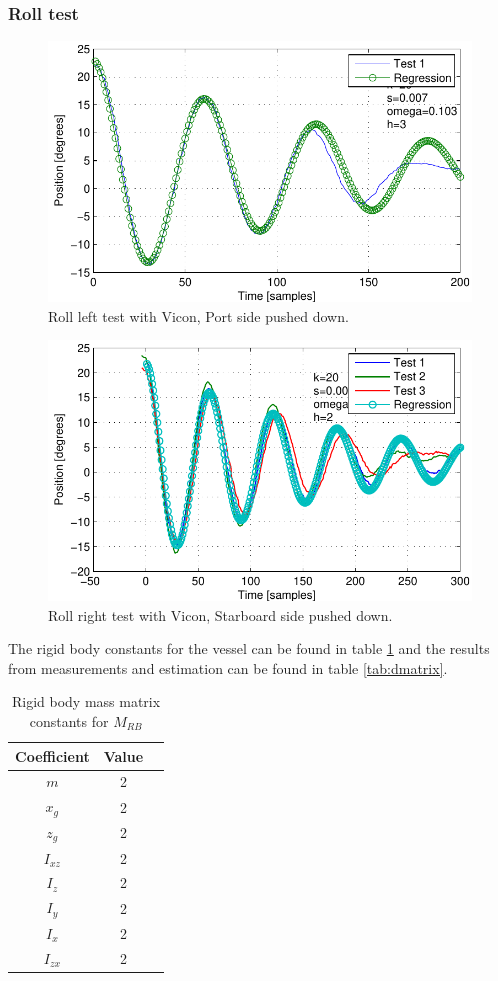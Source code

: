 \subsubsection{Roll test}
\begin{figure}[H]
	\centering
	\includegraphics{plot/rltest}
	\caption{Roll left test with Vicon, Port side pushed down.}
	\label{fig:rltest}
\end{figure}
\begin{figure}[H]
	\centering
	\includegraphics{plot/rrtest}
	\caption{Roll right test with Vicon, Starboard side pushed down.}
	\label{fig:rrtest}
\end{figure}


The rigid body constants for the vessel can be found in table \ref{tab:constants} and the results from measurements and estimation can be found in table \ref{tab:dmatrix}.
\begin{table}[htbp]
\centering
\begin{tabular}{ccc}
	\toprule
  Coefficient & Value \\
  \midrule
  $m$ & 2 \\
  $x_g$ & 2 \\
  $z_g$ & 2\\
  $I_{xz}$ & 2 \\
  $I_z$ & 2 \\
  $I_y$ & 2 \\
  $I_x$ & 2 \\
  $I_{zx}$ & 2 \\
  \bottomrule
\end{tabular}
\caption{Rigid body mass matrix constants for $M_{RB}$}
\label{tab:constants}
\end{table}

